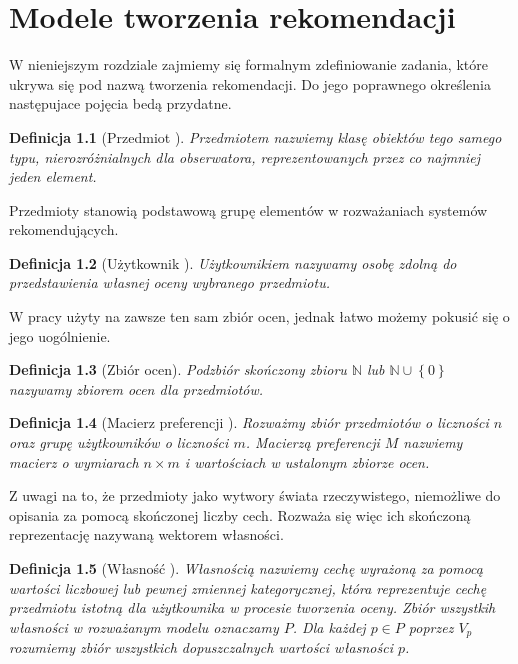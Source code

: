 \documentclass[12pt,a4paper]{report}
\newtheorem{df}{Definicja}[chapter]
\newcommand{\setN}{\mathbb{N}}
\newcommand{\set}[1]{\left\lbrace {#1} \right\rbrace}
\begin{document}
\chapter{Modele tworzenia rekomendacji}

W nieniejszym rozdziale zajmiemy się formalnym zdefiniowanie zadania, które ukrywa się pod nazwą tworzenia rekomendacji. Do jego poprawnego określenia następujace pojęcia bedą przydatne.

\begin{df}[Przedmiot \citep{kidzinski}]
 Przedmiotem nazwiemy klasę obiektów tego samego typu, nierozróżnialnych dla obserwatora, reprezentowanych przez co najmniej jeden element.
\end{df}

Przedmioty stanowią podstawową grupę elementów w rozważaniach systemów rekomendujących. 

\begin{df}[Użytkownik \citep{kidzinski}]
Użytkownikiem nazywamy osobę zdolną do przedstawienia własnej oceny wybranego przedmiotu.
\end{df}

W pracy \citep{kidzinski} użyty na zawsze ten sam zbiór ocen, jednak łatwo możemy pokusić się o jego uogólnienie.

\begin{df}[Zbiór ocen]
Podzbiór skończony zbioru $\setN$ lub $\setN \cup \set{0}$ nazywamy zbiorem ocen dla przedmiotów. 
\end{df} 

\begin{df}[Macierz preferencji {\citep[Sec 1.3 Def. 3.]{kidzinski}}]
Rozważmy zbiór przedmiotów o liczności $n$ oraz grupę użytkowników o liczności $m$. Macierzą preferencji $M$ nazwiemy macierz o wymiarach $n \times m$ i wartościach w ustalonym zbiorze ocen.
\end{df}

Z uwagi na to, że przedmioty jako wytwory świata rzeczywistego, niemożliwe do opisania za pomocą skończonej liczby cech. Rozważa się więc ich skończoną reprezentację nazywaną wektorem własności.

\begin{df}[Własność \citep{kidzinski}]
Własnością nazwiemy cechę wyrażoną za pomocą wartości liczbowej lub pewnej zmiennej kategorycznej, która reprezentuje cechę przedmiotu istotną dla użytkownika w procesie tworzenia oceny. Zbiór wszystkih własności w rozważanym modelu oznaczamy $P$. Dla każdej $p \in P$ poprzez $V_p$ rozumiemy zbiór wszystkich dopuszczalnych wartości własności $p$.
\end{df}
\end{document}
